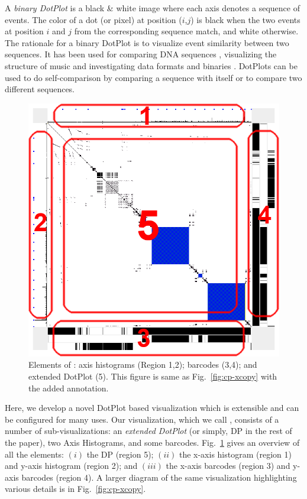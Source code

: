 
A {\em binary DotPlot} is a black \& white image
where each axis denotes a sequence of events.
The color of a dot (or pixel) at position ($i$,$j$) is black
when the two events at position $i$ and $j$ from the corresponding sequence
match, and white otherwise.
The rationale for a binary DotPlot is to visualize event similarity
between two sequences.
It has been used for comparing DNA sequences \cite{dnadp},
visualizing the structure of music \cite{audio}
and investigating data formats and binaries \cite{doxpara}.
DotPlots can be used to do self-comparison
by comparing a sequence with itself or to compare
two different sequences.

\begin{figure}[tb]
\begin{center}
\includegraphics[width=0.5\columnwidth]{lviz/elements.png}
\caption{Elements of \VDP{}: axis histograms (Region 1,2);
barcodes (3,4); and extended DotPlot (5). This figure is same as
Fig.~\ref{fig:cp-xcopy} with the added annotation.}
\label{fig:elements}
\end{center}
\end{figure}

Here, we develop a novel DotPlot based visualization which is
extensible and can be configured for many uses.
Our visualization, which we call {\em \VDP{}},
consists of a number of sub-visualizations:
an {\em extended DotPlot} (or simply, DP in the rest of the paper), two
Axis Histograms, and some barcodes.
Fig.~\ref{fig:elements} gives an overview of all the elements:
$(i)$ the DP (region 5);
$(ii)$ the x-axis histogram (region 1) and
y-axis histogram (region 2);
and $(iii)$ the x-axis barcodes (region 3) and
y-axis barcodes (region 4).
A larger diagram of the same visualization highlighting various
details is in Fig.~\ref{fig:cp-xcopy}.

